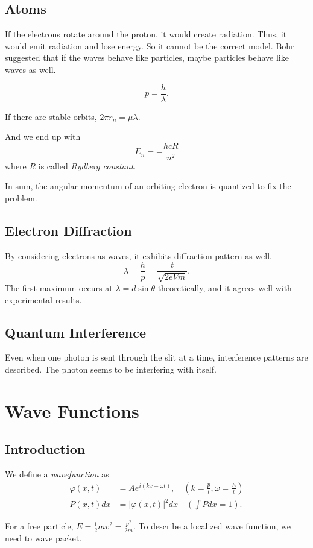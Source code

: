 \subsection{Atoms}
If the electrons rotate around the proton, it would create radiation. Thus, it would emit radiation and lose energy. So it cannot be the correct model. Bohr suggested that if the waves behave like particles, maybe particles behave like waves as well.

\[
    p = \frac{h}{\lambda}.
\]

If there are stable orbits, \(2\pi r_n = \mu \lambda\).

And we end up with
\[
    E_n = -\frac{hcR}{n^2}
\]
where \(R\) is called \textit{Rydberg constant}.

In sum, the angular momentum of an orbiting electron is quantized to fix the problem.

\subsection{Electron Diffraction}
By considering electrons as waves, it exhibits diffraction pattern as well.
\[
    \lambda = \frac{h}{p} = \frac{t}{\sqrt{2eVm} }.
\]
The first maximum occurs at \(\lambda = d \sin \theta\) theoretically, and it agrees well with experimental results.

\subsection{Quantum Interference}
Even when one photon is sent through the slit at a time, interference patterns are described. The photon seems to be interfering with itself.

\section{Wave Functions}
\subsection{Introduction}
\leavevmode
\begin{definition}
    We define a \textit{wavefunction} as
    \begin{align*}
        \varphi(x, t) &= A e^{i(kx - \omega t)},\quad (k = \frac{p}{t}, \omega = \frac{E}{t})\\
        P(x,t)dx &= \left\vert \varphi(x,t) \right\vert ^2 dx \quad (\int P dx = 1).
    \end{align*}
\end{definition}
For a free particle, \(E = \frac{1}{2} mv^2 = \frac{p^2}{2m}\). To describe a localized wave function, we need to wave packet.